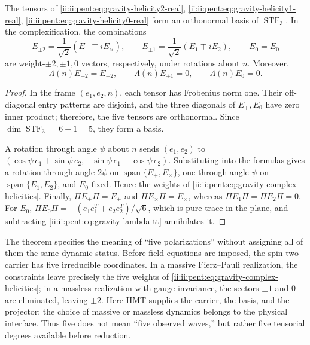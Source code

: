 \begin{theorem}
\label{ii:ii:pent:thm:gravity-five-helicities}
The tensors of
\eqref{ii:ii:pent:eq:gravity-helicity2-real}, \eqref{ii:ii:pent:eq:gravity-helicity1-real}, \eqref{ii:ii:pent:eq:gravity-helicity0-real}
form an orthonormal basis of \(\operatorname{STF}_3\). In the
complexification, the combinations
\begin{equation}
\label{ii:ii:pent:eq:gravity-complex-helicities}
E_{\pm2}=\frac1{\sqrt2}(E_+\mp i E_\times),
\qquad
E_{\pm1}=\frac1{\sqrt2}(E_1\mp i E_2),
\qquad E_0=E_0
\end{equation}
are weight-\(\pm2,\pm1,0\) vectors, respectively, under rotations
about \(n\). Moreover,
\begin{equation}
\label{ii:ii:pent:eq:gravity-tt-on-five}
\Lambda(n)E_{\pm2}=E_{\pm2},
\qquad
\Lambda(n)E_{\pm1}=0,
\qquad
\Lambda(n)E_0=0.
\end{equation}
\end{theorem}

\begin{proof}
In the frame \((e_1,e_2,n)\), each tensor has Frobenius norm one.
Their off-diagonal entry patterns are disjoint, and the three diagonals
of \(E_+,E_0\) have zero inner product; therefore, the five tensors
are orthonormal. Since \(\dim\operatorname{STF}_3=6-1=5\), they form a basis.

A rotation through angle \(\psi\) about \(n\) sends
\((e_1,e_2)\) to
\((\cos\psi\,e_1+\sin\psi\,e_2,
-\sin\psi\,e_1+\cos\psi\,e_2)\). Substituting into the formulas gives
a rotation through angle \(2\psi\) on
\(\operatorname{span}\{E_+,E_\times\}\), one through angle \(\psi\) on
\(\operatorname{span}\{E_1,E_2\}\), and \(E_0\) fixed. Hence the weights of
\eqref{ii:ii:pent:eq:gravity-complex-helicities}. Finally,
\(\Pi E_{+}\Pi=E_+\) and \(\Pi E_\times\Pi=E_\times\), whereas
\(\Pi E_1\Pi=\Pi E_2\Pi=0\). For \(E_0\),
\(\Pi E_0\Pi=-(e_1e_1^T+e_2e_2^T)/\sqrt6\), which is pure trace in
the plane, and subtracting \eqref{ii:ii:pent:eq:gravity-lambda-tt} annihilates it.
\end{proof}

The theorem specifies the meaning of ``five polarizations'' without assigning all of them the same dynamic status. Before field equations are imposed, the spin-two carrier has five irreducible coordinates. In a massive Fierz--Pauli realization, the constraints leave precisely the five weights of \eqref{ii:ii:pent:eq:gravity-complex-helicities}; in a massless realization with gauge invariance, the sectors \(\pm1\) and \(0\) are eliminated, leaving \(\pm2\). Here HMT supplies the carrier, the basis, and the projector; the choice of massive or massless dynamics belongs to the physical interface. Thus five does not mean ``five observed waves,'' but rather five tensorial degrees available before reduction.

